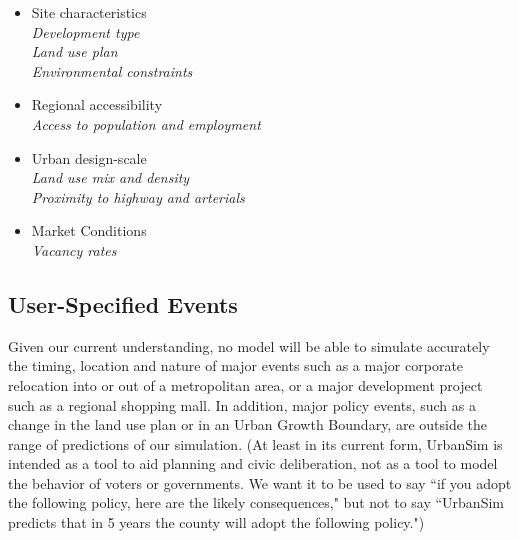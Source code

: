 \documentclass[fleqn]{article}
\begin{document}
\begin{itemize}

\item Site characteristics \\
\hspace*{2 mm} \emph{Development type \\
\hspace*{2 mm} Land use plan \\
\hspace*{2 mm} Environmental constraints}

\item Regional accessibility \\
\hspace*{2 mm} \emph{Access to population and employment}

\item Urban design-scale \\
\hspace*{2 mm} \emph{Land use mix and density \\
\hspace*{2 mm} Proximity to highway and arterials}

\item Market Conditions \\
\hspace*{2 mm} \emph{Vacancy rates}

\end{itemize}

\subsection{User-Specified Events}

Given our current understanding, no model will be able to simulate
accurately the timing, location and nature of major events such as
a major corporate relocation into or out of a metropolitan area,
or a major development project such as a regional shopping mall.
In addition, major policy events, such as a change in the land use
plan or in an Urban Growth Boundary, are outside the range of
predictions of our simulation.  (At least in its current form,
UrbanSim is intended as a tool to aid planning and civic
deliberation, not as a tool to model the behavior of voters or
governments.  We want it to be used to say ``if you adopt the
following policy, here are the likely consequences," but not to
say ``UrbanSim predicts that in 5 years the county will adopt the
following policy.")
\end{document}
